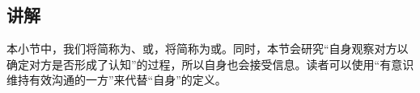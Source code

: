 \subsection{讲解}
\begin{explain}
本小节中，我们将简称为、或，将简称为或。同时，本节会研究“自身观察对方以确定对方是否形成了认知”的过程，所以自身也会接受信息。读者可以使用“有意识维持有效沟通的一方”来代替“自身”的定义。
\end{explain}

